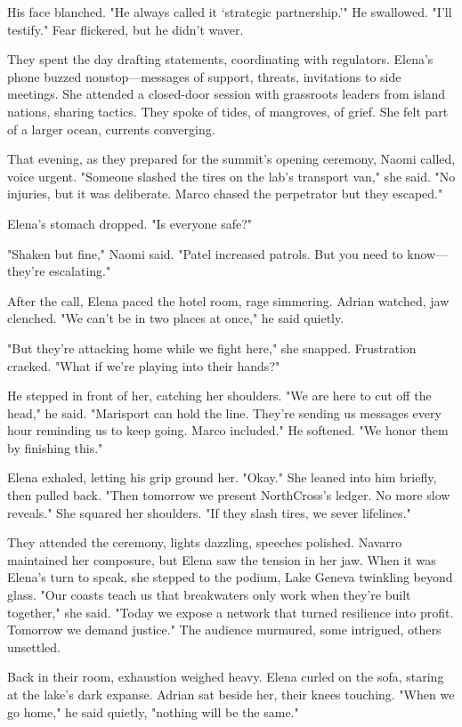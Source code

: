 His face blanched. "He always called it `strategic partnership.'" He swallowed. "I'll testify." Fear flickered, but he didn't waver.

They spent the day drafting statements, coordinating with regulators. Elena's phone buzzed nonstop—messages of support, threats, invitations to side meetings. She attended a closed-door session with grassroots leaders from island nations, sharing tactics. They spoke of tides, of mangroves, of grief. She felt part of a larger ocean, currents converging.

That evening, as they prepared for the summit's opening ceremony, Naomi called, voice urgent. "Someone slashed the tires on the lab's transport van," she said. "No injuries, but it was deliberate. Marco chased the perpetrator but they escaped."

Elena's stomach dropped. "Is everyone safe?"

"Shaken but fine," Naomi said. "Patel increased patrols. But you need to know—they're escalating."

After the call, Elena paced the hotel room, rage simmering. Adrian watched, jaw clenched. "We can't be in two places at once," he said quietly.

"But they're attacking home while we fight here," she snapped. Frustration cracked. "What if we're playing into their hands?"

He stepped in front of her, catching her shoulders. "We are here to cut off the head," he said. "Marisport can hold the line. They're sending us messages every hour reminding us to keep going. Marco included." He softened. "We honor them by finishing this."

Elena exhaled, letting his grip ground her. "Okay." She leaned into him briefly, then pulled back. "Then tomorrow we present NorthCross's ledger. No more slow reveals." She squared her shoulders. "If they slash tires, we sever lifelines."

They attended the ceremony, lights dazzling, speeches polished. Navarro maintained her composure, but Elena saw the tension in her jaw. When it was Elena's turn to speak, she stepped to the podium, Lake Geneva twinkling beyond glass. "Our coasts teach us that breakwaters only work when they're built together," she said. "Today we expose a network that turned resilience into profit. Tomorrow we demand justice." The audience murmured, some intrigued, others unsettled.

Back in their room, exhaustion weighed heavy. Elena curled on the sofa, staring at the lake's dark expanse. Adrian sat beside her, their knees touching. "When we go home," he said quietly, "nothing will be the same."

